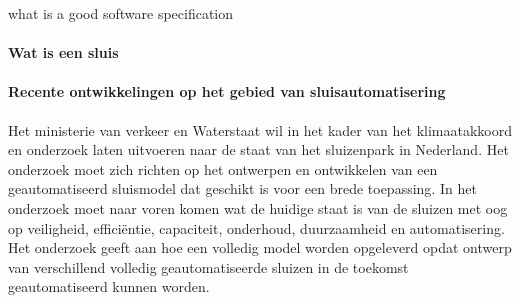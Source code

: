 what is a good software specification

\cite{fvaandrager2322010Goodmodel}
\cite{onix01102022devopmodel}
\cite{sulemani04012021softwareprocesmodel}
\cite{globalluxsoft18102017softdev}
\cite{wiegers30052022SRS}
\cite{muller06092020goodspecification}
\cite{informit30062008reqmanagement}
\cite{altexsoft15092020writingSRS}


\paragraph{Wat is een sluis}
\cite{woudagemaalSluizen}
\cite{bardetsluizenAmsterdam}
\cite{historischesluizen}
\paragraph{Recente ontwikkelingen op het gebied van sluisautomatisering}

Het ministerie van verkeer en Waterstaat wil in het kader van het klimaatakkoord en onderzoek laten uitvoeren naar de staat van het sluizenpark in Nederland. Het onderzoek moet zich richten op het ontwerpen en ontwikkelen van een geautomatiseerd sluismodel dat geschikt is voor een brede toepassing. In het onderzoek moet naar voren komen wat de huidige staat is van de sluizen met oog op veiligheid, efficiëntie, capaciteit, onderhoud, duurzaamheid en automatisering. Het onderzoek geeft aan hoe een volledig model worden opgeleverd opdat ontwerp van verschillend volledig geautomatiseerde sluizen in de toekomst geautomatiseerd kunnen worden.  


